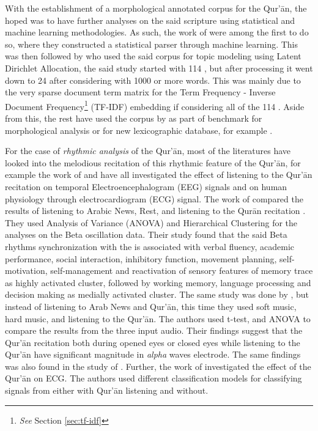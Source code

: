 With the establishment of a morphological annotated corpus for the Qur'\=an, the hoped was to have further analyses on the said scripture using statistical and machine learning methodologies. As such, the work of  were among the first to do so, where they constructed a statistical parser through machine learning. This was then followed by  who used the said corpus for topic modeling using Latent Dirichlet Allocation, the said study started with 114  , but after processing it went down to 24   after considering   with 1000 or more words. This was mainly due to the very sparse document term matrix for the Term Frequency - Inverse Document Frequency\footnote{\textit{See} Section \ref{sec:tf-idf}} (TF-IDF) embedding if considering all of the 114  . Aside from this, the rest have used the corpus by  as part of benchmark for morphological analysis or for new lexicographic database, for example .

For the case of \textit{rhythmic analysis} of the Qur'\=an, most of the literatures have looked into the melodious recitation of this rhythmic feature of the Qur'\=an, for example the work of  and  have all investigated the effect of listening to the Qur'\=an recitation on temporal Electroencephalogram (EEG) signals and on human physiology through electrocardiogram (ECG) signal. The work of  compared the results of listening to Arabic News, Rest, and listening to the Qur\=an recitation  . They used Analysis of Variance (ANOVA) and Hierarchical Clustering for the analyses on the Beta oscillation data. Their study found that the said Beta rhythms synchronization
with the   is associated with verbal fluency, academic performance, social
interaction, inhibitory function, movement planning, self-motivation, self-management and
reactivation of sensory features of memory trace as highly activated cluster, followed by working memory, language processing and decision making as medially activated cluster. The same study was done by , but instead of listening to Arab News and Qur'\=an, this time they used soft music, hard music, and listening to the Qur'\=an. The authors used t-test, and ANOVA to compare the results from the three input audio. Their findings suggest that the Qur'\=an recitation both during opened eyes or closed eyes while listening to the Qur'\=an have significant magnitude in \textit{alpha} waves electrode. The same findings was also found in the study of . Further, the work of  investigated the effect of the Qur'\=an on ECG. The authors used different classification models for classifying signals from either with Qur'\=an listening and without.


